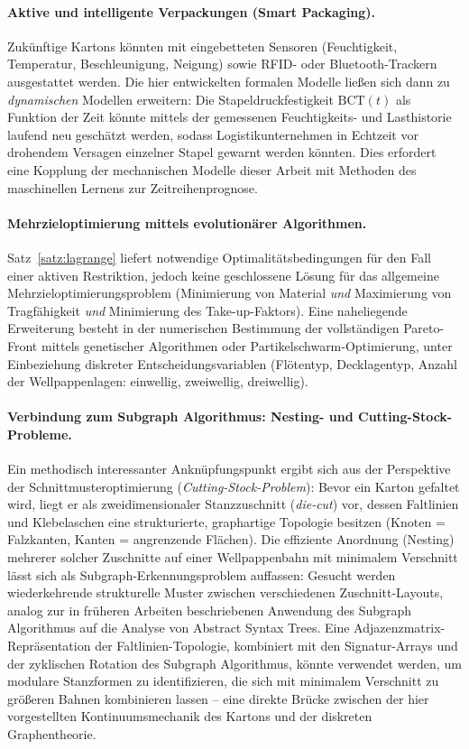 ﻿\documentclass[a4paper,12pt]{article}
\theoremstyle{definition}
\begin{document}
\paragraph{Aktive und intelligente Verpackungen (Smart Packaging).}
Zukünftige Kartons könnten mit eingebetteten Sensoren (Feuchtigkeit,
Temperatur, Beschleunigung, Neigung) sowie RFID- oder Bluetooth-Trackern
ausgestattet werden. Die hier entwickelten formalen Modelle ließen sich dann zu
\emph{dynamischen} Modellen erweitern: Die Stapeldruckfestigkeit
$\mathrm{BCT}(t)$ als Funktion der Zeit könnte mittels der gemessenen
Feuchtigkeits- und Lasthistorie laufend neu geschätzt werden, sodass
Logistikunternehmen in Echtzeit vor drohendem Versagen einzelner Stapel gewarnt
werden könnten. Dies erfordert eine Kopplung der mechanischen Modelle dieser
Arbeit mit Methoden des maschinellen Lernens zur Zeitreihenprognose.

\paragraph{Mehrzieloptimierung mittels evolutionärer Algorithmen.}
Satz~\ref{satz:lagrange} liefert notwendige Optimalitätsbedingungen für den Fall
einer aktiven Restriktion, jedoch keine geschlossene Lösung für das allgemeine
Mehrzieloptimierungsproblem (Minimierung von Material \emph{und} Maximierung von
Tragfähigkeit \emph{und} Minimierung des Take-up-Faktors). Eine naheliegende
Erweiterung besteht in der numerischen Bestimmung der vollständigen
Pareto-Front mittels genetischer Algorithmen oder Partikelschwarm-Optimierung,
unter Einbeziehung diskreter Entscheidungsvariablen (Flötentyp, Decklagentyp,
Anzahl der Wellpappenlagen: einwellig, zweiwellig, dreiwellig).

\paragraph{Verbindung zum Subgraph Algorithmus: Nesting- und Cutting-Stock-Probleme.}
Ein methodisch interessanter Anknüpfungspunkt ergibt sich aus der Perspektive
der Schnittmusteroptimierung (\emph{Cutting-Stock-Problem}): Bevor ein Karton
gefaltet wird, liegt er als zweidimensionaler Stanzzuschnitt (\emph{die-cut})
vor, dessen Faltlinien und Klebelaschen eine strukturierte, graphartige Topologie
besitzen (Knoten = Falzkanten, Kanten = angrenzende Flächen). Die effiziente
Anordnung (Nesting) mehrerer solcher Zuschnitte auf einer Wellpappenbahn mit
minimalem Verschnitt lässt sich als Subgraph-Erkennungsproblem auffassen:
Gesucht werden wiederkehrende strukturelle Muster zwischen verschiedenen
Zuschnitt-Layouts, analog zur in früheren Arbeiten beschriebenen Anwendung des
Subgraph Algorithmus auf die Analyse von Abstract Syntax Trees. Eine
Adjazenzmatrix-Repräsentation der Faltlinien-Topologie, kombiniert mit den
Signatur-Arrays und der zyklischen Rotation des Subgraph Algorithmus, könnte
verwendet werden, um modulare Stanzformen zu identifizieren, die sich mit
minimalem Verschnitt zu größeren Bahnen kombinieren lassen -- eine direkte
Brücke zwischen der hier vorgestellten Kontinuumsmechanik des Kartons und der
diskreten Graphentheorie.
\end{document}
